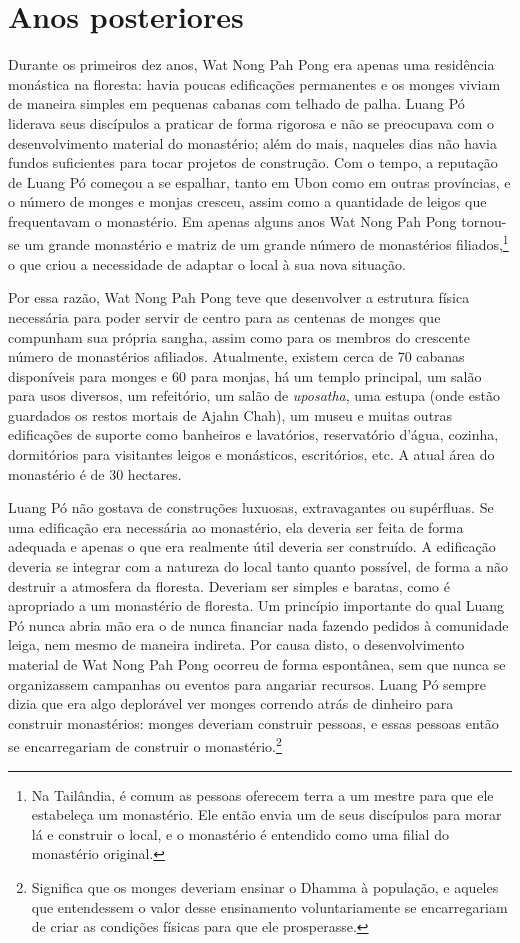 \chapter{Anos posteriores}

Durante os primeiros dez anos, Wat Nong Pah Pong era apenas uma
residência monástica na floresta: havia poucas edificações permanentes e
os monges viviam de maneira simples em pequenas cabanas com telhado de
palha. Luang Pó liderava seus discípulos a praticar de forma rigorosa e
não se preocupava com o desenvolvimento material do monastério; além do
mais, naqueles dias não havia fundos suficientes para tocar projetos de
construção. Com o tempo, a reputação de Luang Pó começou a se espalhar,
tanto em Ubon como em outras províncias, e o número de monges e monjas
cresceu, assim como a quantidade de leigos que frequentavam o
monastério. Em apenas alguns anos Wat Nong Pah Pong tornou-se um grande
monastério e matriz de um grande número de monastérios
filiados,\footnote{Na Tailândia, é comum as pessoas oferecem terra a um
  mestre para que ele estabeleça um monastério. Ele então envia um de
  seus discípulos para morar lá e construir o local, e o monastério é
  entendido como uma filial do monastério original.} o que criou a
necessidade de adaptar o local à sua nova situação.

Por essa razão, Wat Nong Pah Pong teve que desenvolver a estrutura
física necessária para poder servir de centro para as centenas de monges
que compunham sua própria sangha, assim como para os membros do
crescente número de monastérios afiliados. Atualmente, existem cerca de
70 cabanas disponíveis para monges e 60 para monjas, há um templo
principal, um salão para usos diversos, um refeitório, um salão de
\emph{uposatha}, uma estupa (onde estão guardados os restos mortais de
Ajahn Chah), um museu e muitas outras edificações de suporte como
banheiros e lavatórios, reservatório d'água, cozinha, dormitórios para
visitantes leigos e monásticos, escritórios, etc. A atual área do
monastério é de 30 hectares.

Luang Pó não gostava de construções luxuosas, extravagantes ou
supérfluas. Se uma edificação era necessária ao monastério, ela deveria
ser feita de forma adequada e apenas o que era realmente útil deveria
ser construído. A edificação deveria se integrar com a natureza do local
tanto quanto possível, de forma a não destruir a atmosfera da floresta.
Deveriam ser simples e baratas, como é apropriado a um monastério de
floresta. Um princípio importante do qual Luang Pó nunca abria mão era o
de nunca financiar nada fazendo pedidos à comunidade leiga, nem mesmo de
maneira indireta. Por causa disto, o desenvolvimento material de Wat
Nong Pah Pong ocorreu de forma espontânea, sem que nunca se organizassem
campanhas ou eventos para angariar recursos. Luang Pó sempre dizia que
era algo deplorável ver monges correndo atrás de dinheiro para construir
monastérios: monges deveriam construir pessoas, e essas pessoas então se
encarregariam de construir o monastério.\footnote{Significa que os monges
  deveriam ensinar o Dhamma à população, e aqueles que entendessem o
  valor desse ensinamento voluntariamente se encarregariam de criar as
  condições físicas para que ele prosperasse.}

